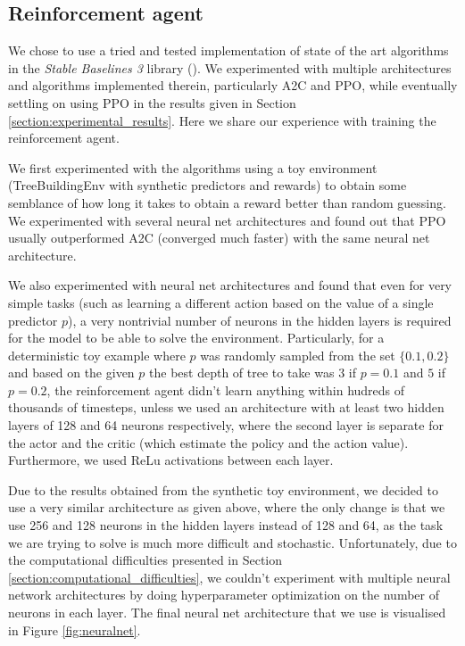 \subsection{Reinforcement agent}
We chose to use a tried and tested implementation of state of the art algorithms in the \textit{Stable Baselines 3} library (\cite{stable_baselines3}). We experimented with multiple architectures and algorithms implemented therein, particularly A2C and PPO, while eventually settling on using PPO in the results given in Section \ref{section:experimental_results}. Here we share our experience with training the reinforcement agent.

We first experimented with the algorithms using a toy environment (TreeBuildingEnv with synthetic predictors and rewards) to obtain some semblance of how long it takes to obtain a reward better than random guessing. We experimented with several neural net architectures and found out that PPO usually outperformed A2C (converged much faster) with the same neural net architecture. 

We also experimented with neural net architectures and found that even for very simple tasks (such as learning a different action based on the value of a single predictor $p$), a very nontrivial number of neurons in the hidden layers is required for the model to be able to solve the environment. Particularly, for a deterministic toy example where $p$ was randomly sampled from the set $\{0.1, 0.2\}$ and based on the given $p$ the best depth of tree to take was $3$ if $p=0.1$ and $5$ if $p=0.2$, the reinforcement agent didn't learn anything within hudreds of thousands of timesteps, unless we used an architecture with at least two hidden layers of 128 and 64 neurons respectively, where the second layer is separate for the actor and the critic (which estimate the policy and the action value). Furthermore, we used ReLu activations between each layer. 

Due to the results obtained from the synthetic toy environment, we decided to use a very similar architecture as given above, where the only change is that we use 256 and 128 neurons in the hidden layers instead of 128 and 64, as the task we are trying to solve is much more difficult and stochastic. Unfortunately, due to the computational difficulties presented in Section \ref{section:computational_difficulties}, we couldn't experiment with multiple neural network architectures by doing hyperparameter optimization on the number of neurons in each layer. The final neural net architecture that we use is visualised in Figure \ref{fig:neuralnet}. 

